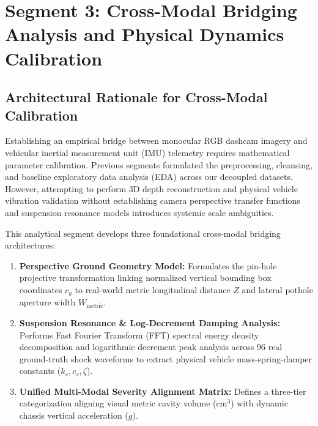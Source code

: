
\section{Segment 3: Cross-Modal Bridging Analysis and Physical Dynamics Calibration}

\subsection{Architectural Rationale for Cross-Modal Calibration}
Establishing an empirical bridge between monocular RGB dashcam imagery and vehicular inertial measurement unit (IMU) telemetry requires mathematical parameter calibration. Previous segments formulated the preprocessing, cleansing, and baseline exploratory data analysis (EDA) across our decoupled datasets. However, attempting to perform 3D depth reconstruction and physical vehicle vibration validation without establishing camera perspective transfer functions and suspension resonance models introduces systemic scale ambiguities.

This analytical segment develops three foundational cross-modal bridging architectures:
\begin{enumerate}
    \item \textbf{Perspective Ground Geometry Model:} Formulates the pin-hole projective transformation linking normalized vertical bounding box coordinates $c_y$ to real-world metric longitudinal distance $Z$ and lateral pothole aperture width $W_{\text{metric}}$.
    \item \textbf{Suspension Resonance \& Log-Decrement Damping Analysis:} Performs Fast Fourier Transform (FFT) spectral energy density decomposition and logarithmic decrement peak analysis across 96 real ground-truth shock waveforms to extract physical vehicle mass-spring-damper constants ($k_s, c_s, \zeta$).
    \item \textbf{Unified Multi-Modal Severity Alignment Matrix:} Defines a three-tier categorization aligning visual metric cavity volume ($\text{cm}^3$) with dynamic chassis vertical acceleration ($g$).
\end{enumerate}

